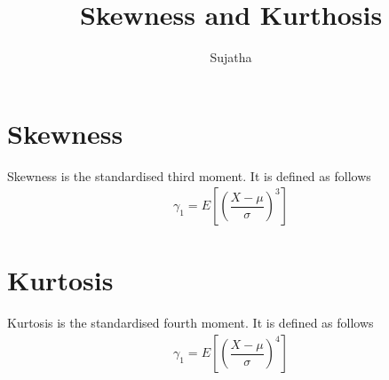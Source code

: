 \documentclass{article}
\author{Sujatha}
\title{Skewness and Kurthosis}
\begin{document}
\maketitle
\section{Skewness}
Skewness is the standardised third moment. It is defined as follows
\begin{align*}
 \gamma_1 = E\left[\left(\dfrac{X -\mu}{\sigma}\right)^3  \right]
\end{align*}
\section{Kurtosis}
Kurtosis is the standardised fourth moment. It is defined as follows
\begin{align*}
 \gamma_1 = E\left[\left(\dfrac{X -\mu}{\sigma}\right)^4  \right]
\end{align*}
\end{document}
